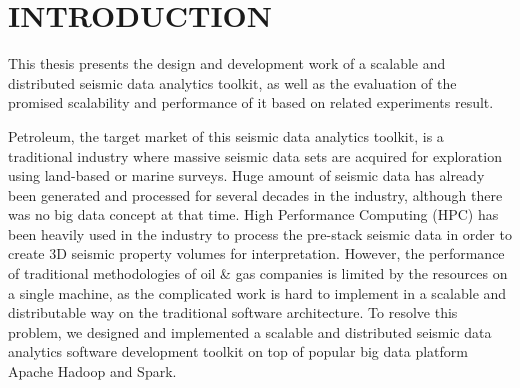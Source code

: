 %
%
%



\pagestyle{plain} %
\setcounter{page}{1}


\chapter{\uppercase {Introduction}}

This thesis presents the design and development work of a scalable and distributed seismic data analytics toolkit,  as well as the evaluation of the promised scalability and performance of it based on related experiments result.

Petroleum, the target market of this seismic data analytics toolkit, is a traditional industry where massive seismic data sets are acquired for exploration using land-based or marine surveys. Huge amount of seismic data has already been generated and processed for several decades in the industry, although there was no big data concept at that time. High Performance Computing (HPC) has been heavily used in the industry to process the pre-stack seismic data in order to create 3D seismic property volumes for interpretation. However, the performance of traditional methodologies of oil \& gas companies is limited by the resources on a single machine, as the complicated work is hard to implement in a scalable and distributable way on the traditional software architecture. To resolve this problem, we designed and implemented a scalable and distributed seismic data analytics software development toolkit on top of popular big data platform Apache Hadoop and Spark.



